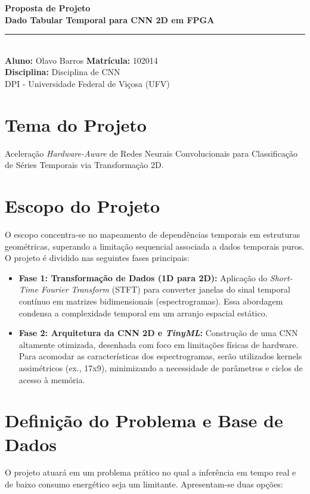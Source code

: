 \documentclass[12pt,a4paper]{article}
\begin{document}
\begin{center}
    {\LARGE \textbf{Proposta de Projeto}}\\[0.5em]
    {\large \textbf{Dado Tabular Temporal para CNN 2D em FPGA}}\\[1em]
    \textcolor{gray}{\rule{\textwidth}{1pt}}\\[1em]
    \textbf{Aluno:} Olavo Barros \quad \textbf{Matrícula:} 102014\\[0.5em]
    \textbf{Disciplina:} Disciplina de CNN \\[0.5em]
    DPI - Universidade Federal de Viçosa (UFV)
\end{center}
\vspace{1.5em}

\section*{Tema do Projeto}
Aceleração \textit{Hardware-Aware} de Redes Neurais Convolucionais para Classificação de Séries Temporais via Transformação 2D.

\section*{Escopo do Projeto}
O escopo concentra-se no mapeamento de dependências temporais em estruturas geométricas, superando a limitação sequencial associada a dados temporais puros. O projeto é dividido nas seguintes fases principais:

\begin{itemize}[leftmargin=*]
    \item \textbf{Fase 1: Transformação de Dados (1D para 2D):} Aplicação do \textit{Short-Time Fourier Transform} (STFT) para converter janelas do sinal temporal contínuo em matrizes bidimensionais (espectrogramas). Essa abordagem condensa a complexidade temporal em um arranjo espacial estático.
    \item \textbf{Fase 2: Arquitetura da CNN 2D e \textit{TinyML}:} Construção de uma CNN altamente otimizada, desenhada com foco em limitações físicas de hardware. Para acomodar as características dos espectrogramas, serão utilizados kernels assimétricos (ex., 17x9), minimizando a necessidade de parâmetros e ciclos de acesso à memória.
\end{itemize}

\section*{Definição do Problema e Base de Dados}
O projeto atuará em um problema prático no qual a inferência em tempo real e de baixo consumo energético seja um limitante. Apresentam-se duas opções:
\end{document}
